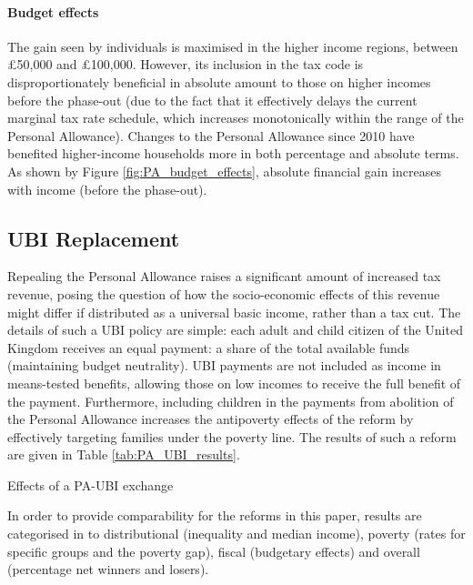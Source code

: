 \documentclass{article}
\begin{document}
    \paragraph{Budget effects} The gain seen by individuals is maximised in the higher income regions, between £50,000 and £100,000. However, its inclusion in the tax code is disproportionately beneficial in absolute amount to those on higher incomes before the phase-out (due to the fact that it effectively delays the current marginal tax rate schedule, which increases monotonically within the range of the Personal Allowance). Changes to the Personal Allowance since 2010 have benefited higher-income households more in both percentage and absolute terms.\cite{sterling_arnold} As shown by Figure \ref{fig:PA_budget_effects}, absolute financial gain increases with income (before the phase-out). 

    \subsection{UBI Replacement}

    Repealing the Personal Allowance raises a significant amount of increased tax revenue, posing the question of how the socio-economic effects of this revenue might differ if distributed as a universal basic income, rather than a tax cut. The details of such a UBI policy are simple: each adult and child citizen of the United Kingdom receives an equal payment: a share of the total available funds (maintaining budget neutrality). UBI payments are not included as income in means-tested benefits, allowing those on low incomes to receive the full benefit of the payment. Furthermore, including children in the payments from abolition of the Personal Allowance increases the antipoverty effects of the reform by effectively targeting families under the poverty line.\cite{ines} The results of such a reform are given in Table \ref{tab:PA_UBI_results}.
    \begin{table}
        \centering
        
        \caption{Effects of a PA-UBI exchange}
        \label{tab:PA_UBI_results}
    \end{table}
    
    In order to provide comparability for the reforms in this paper, results are categorised in to distributional (inequality and median income), poverty (rates for specific groups and the poverty gap), fiscal (budgetary effects) and overall (percentage net winners and losers). 
    
\end{document}
